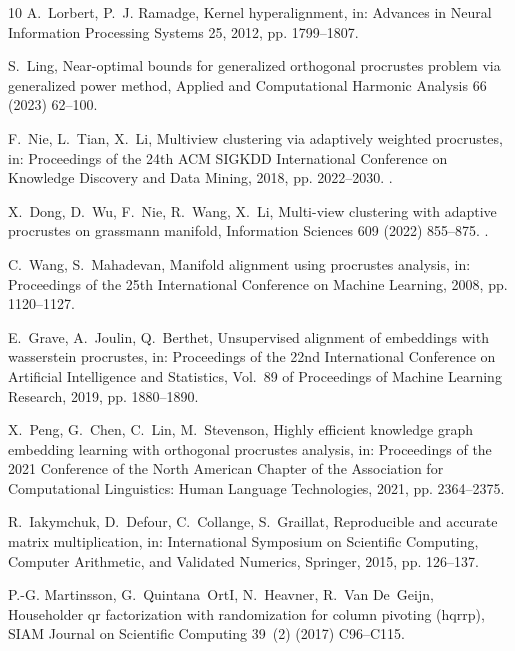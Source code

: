 \documentclass[final,3p,times]{elsarticle}
\theoremstyle{plain}
\begin{document}
\begin{thebibliography}{10}
A.~Lorbert, P.~J. Ramadge, Kernel hyperalignment, in: Advances in Neural Information Processing Systems 25, 2012, pp. 1799--1807.

S.~Ling, Near-optimal bounds for generalized orthogonal procrustes problem via generalized power method, Applied and Computational Harmonic Analysis 66 (2023) 62--100.

F.~Nie, L.~Tian, X.~Li, Multiview clustering via adaptively weighted procrustes, in: Proceedings of the 24th ACM SIGKDD International Conference on Knowledge Discovery and Data Mining, 2018, pp. 2022--2030.
\newblock \href {https://doi.org/10.1145/3219819.3220049} {}.

X.~Dong, D.~Wu, F.~Nie, R.~Wang, X.~Li, Multi-view clustering with adaptive procrustes on grassmann manifold, Information Sciences 609 (2022) 855--875.
\newblock \href {https://doi.org/10.1016/j.ins.2022.07.089} {}.

C.~Wang, S.~Mahadevan, Manifold alignment using procrustes analysis, in: Proceedings of the 25th International Conference on Machine Learning, 2008, pp. 1120--1127.

E.~Grave, A.~Joulin, Q.~Berthet, Unsupervised alignment of embeddings with wasserstein procrustes, in: Proceedings of the 22nd International Conference on Artificial Intelligence and Statistics, Vol.~89 of Proceedings of Machine Learning Research, 2019, pp. 1880--1890.

X.~Peng, G.~Chen, C.~Lin, M.~Stevenson, Highly efficient knowledge graph embedding learning with orthogonal procrustes analysis, in: Proceedings of the 2021 Conference of the North American Chapter of the Association for Computational Linguistics: Human Language Technologies, 2021, pp. 2364--2375.

R.~Iakymchuk, D.~Defour, C.~Collange, S.~Graillat, Reproducible and accurate matrix multiplication, in: International Symposium on Scientific Computing, Computer Arithmetic, and Validated Numerics, Springer, 2015, pp. 126--137.

P.-G. Martinsson, G.~Quintana~OrtI, N.~Heavner, R.~Van De~Geijn, Householder qr factorization with randomization for column pivoting (hqrrp), SIAM Journal on Scientific Computing 39~(2) (2017) C96--C115.


\end{thebibliography}
\end{document}
